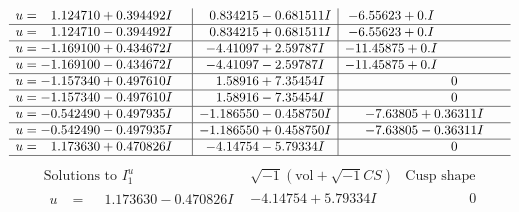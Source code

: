\documentclass[1p]{elsarticle_modified}
\theoremstyle{definition}
\newcommand{\I}{\sqrt{-1}}
\begin{document}
$$\begin{array}{c|c|c}
\begin{aligned}
u &= \phantom{-}1.124710 + 0.394492 I\end{aligned}
 & \phantom{-}0.834215 - 0.681511 I & -6.55623 + 0. I\phantom{ +0.000000I} \\ \hline\begin{aligned}
u &= \phantom{-}1.124710 - 0.394492 I\end{aligned}
 & \phantom{-}0.834215 + 0.681511 I & -6.55623 + 0. I\phantom{ +0.000000I} \\ \hline\begin{aligned}
u &= -1.169100 + 0.434672 I\end{aligned}
 & -4.41097 + 2.59787 I & -11.45875 + 0. I\phantom{ +0.000000I} \\ \hline\begin{aligned}
u &= -1.169100 - 0.434672 I\end{aligned}
 & -4.41097 - 2.59787 I & -11.45875 + 0. I\phantom{ +0.000000I} \\ \hline\begin{aligned}
u &= -1.157340 + 0.497610 I\end{aligned}
 & \phantom{-}1.58916 + 7.35454 I & \phantom{-0.000000 } 0 \\ \hline\begin{aligned}
u &= -1.157340 - 0.497610 I\end{aligned}
 & \phantom{-}1.58916 - 7.35454 I & \phantom{-0.000000 } 0 \\ \hline\begin{aligned}
u &= -0.542490 + 0.497935 I\end{aligned}
 & -1.186550 - 0.458750 I & -7.63805 + 0.36311 I \\ \hline\begin{aligned}
u &= -0.542490 - 0.497935 I\end{aligned}
 & -1.186550 + 0.458750 I & -7.63805 - 0.36311 I \\ \hline\begin{aligned}
u &= \phantom{-}1.173630 + 0.470826 I\end{aligned}
 & -4.14754 - 5.79334 I & \phantom{-0.000000 } 0\\
 \hline 
 \end{array}$$\newpage$$\begin{array}{c|c|c}  
\text{Solutions to }I^u_{1}& \I (\text{vol} + \sqrt{-1}CS) & \text{Cusp shape}\\
 \hline 
\begin{aligned}
u &= \phantom{-}1.173630 - 0.470826 I\end{aligned}
 & -4.14754 + 5.79334 I & \phantom{-0.000000 } 0 \\ \hline\begin{aligned}

\end{aligned}
\end{array}$$
\end{document}
